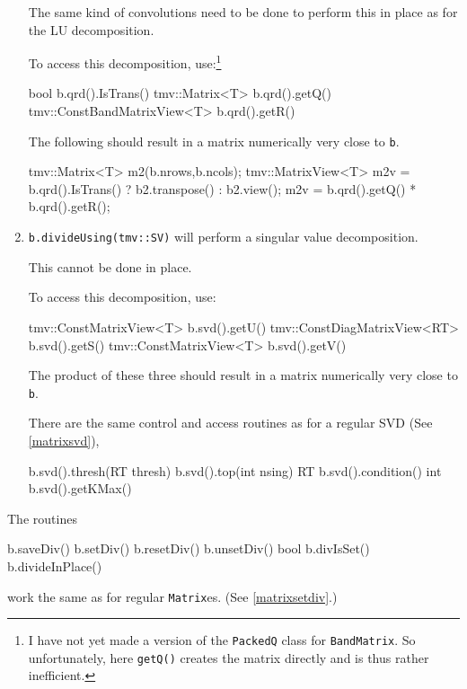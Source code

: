 \documentclass[twoside,letterpaper,11pt]{article}
\renewcommand{\tt}[1]{{\lstinline {#1}}}
\begin{document}
\begin{enumerate}
The same kind of convolutions need to be done to perform this in place as 
for the LU decomposition.

To access this decomposition, use:\footnote{
I have not yet made a version of the \tt{PackedQ} class for \tt{BandMatrix}.
So unfortunately, here \tt{getQ()} creates the matrix directly and is thus
rather inefficient.}
\begin{tmvcode}
bool b.qrd().IsTrans()
tmv::Matrix<T> b.qrd().getQ()
tmv::ConstBandMatrixView<T> b.qrd().getR()
\end{tmvcode}
The following should result in a matrix numerically very close to \tt{b}.
\begin{tmvcode}
tmv::Matrix<T> m2(b.nrows,b.ncols);
tmv::MatrixView<T> m2v = 
      b.qrd().IsTrans() ? b2.transpose() : b2.view();
m2v = b.qrd().getQ() * b.qrd().getR();
\end{tmvcode}

\item
\tt{b.divideUsing(tmv::SV)} will perform a singular value decomposition.

This cannot be done in place.

To access this decomposition, use:
\begin{tmvcode}
tmv::ConstMatrixView<T> b.svd().getU()
tmv::ConstDiagMatrixView<RT> b.svd().getS()
tmv::ConstMatrixView<T> b.svd().getV()
\end{tmvcode}
The product of these three
should result in a matrix numerically very close to \tt{b}.

There are the same control and access routines as for a regular SVD
(See \ref{matrixsvd}),
\begin{tmvcode}
b.svd().thresh(RT thresh)
b.svd().top(int nsing)
RT b.svd().condition()
int b.svd().getKMax()
\end{tmvcode}

\end{enumerate}
The routines 
\begin{tmvcode}
b.saveDiv()
b.setDiv()
b.resetDiv()
b.unsetDiv()
bool b.divIsSet()
b.divideInPlace()
\end{tmvcode}
work the same as for regular \tt{Matrix}es.
(See \ref{matrixsetdiv}.)
\end{document}
